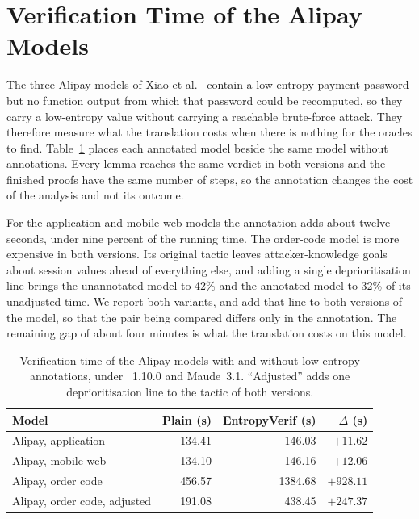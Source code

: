 \section{Verification Time of the Alipay Models}
\label{app:alipay-time}

The three Alipay models of Xiao et al.~\cite{xiao2026payment} contain a low-entropy payment password 
but no function output from which that password could be recomputed, 
so they carry a low-entropy value without carrying a reachable brute-force attack.
They therefore measure what the translation costs when there is nothing for the oracles to find.
Table~\ref{tab:perf-baseline} places each annotated model beside the same model without annotations.
Every lemma reaches the same verdict in both versions and the finished proofs have the same number of steps, 
so the annotation changes the cost of the analysis and not its outcome.

For the application and mobile-web models the annotation adds about twelve seconds, 
under nine percent of the running time.
The order-code model is more expensive in both versions.
Its original tactic leaves attacker-knowledge goals about session values ahead of everything else,
and adding a single deprioritisation line brings the unannotated model to 42\% and the annotated
model to 32\% of its unadjusted time.
We report both variants, and add that line to both versions of the model, so that the pair being
compared differs only in the annotation.
The remaining gap of about four minutes is what the translation costs on this model.

\begin{table}[t]
    \centering
    \caption{Verification time of the Alipay models with and without low-entropy annotations, under \Tamarin{}~1.10.0 and Maude~3.1. ``Adjusted'' adds one deprioritisation line to the tactic of both versions.}
    \label{tab:perf-baseline}
    \small
    \renewcommand{\arraystretch}{1.15}
    \begin{tabularx}{\columnwidth}{@{}>{\raggedright\arraybackslash}X r r r@{}}
    \toprule
    \textbf{Model} & \textbf{Plain (s)} & \textbf{EntropyVerif (s)} & \textbf{$\Delta$ (s)} \\
    \midrule
    Alipay, application          & 134.41 & 146.03 & $+11.62$ \\
    Alipay, mobile web           & 134.10 & 146.16 & $+12.06$ \\
    Alipay, order code           & 456.57 & 1384.68 & $+928.11$ \\
    Alipay, order code, adjusted & 191.08 & 438.45 & $+247.37$ \\
    \bottomrule
    \end{tabularx}
\end{table}

